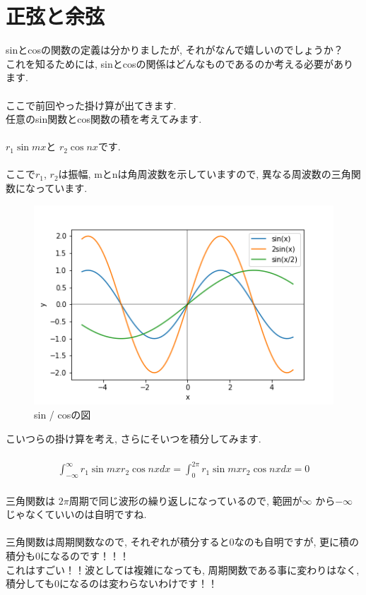 \documentclass[11pt,a4paper]{jreport}
\begin{document}
\section{正弦と余弦}
sinとcosの関数の定義は分かりましたが, それがなんで嬉しいのでしょうか？\\
これを知るためには, sinとcosの関係はどんなものであるのか考える必要があります.\\
\\
ここで前回やった掛け算が出てきます. \\
任意のsin関数とcos関数の積を考えてみます.\\
\\
$r_1\sin mx $と $r_2\cos nx $です.\\
\\
ここで$r_1$, $r_2$は振幅, mとnは角周波数を示していますので, 異なる周波数の三角関数になっています.\\

\begin{figure}[H]
\label{im:sincos}
  \centering
  \includegraphics[width=120mm,bb=0 0 432 288]{figures/sines.png}
  \caption{sin / cosの図}
\end{figure}

こいつらの掛け算を考え, さらにそいつを積分してみます.\\
\\
\begin{eqnarray}
  \int^\infty_{-\infty} r_1\sin mx r_2\cos nx dx = \int^{2\pi}_0 r_1\sin mx r_2\cos nx dx = 0
\end{eqnarray}
\\
三角関数は $2\pi$周期で同じ波形の繰り返しになっているので, 範囲が$\infty$ から$-\infty$じゃなくていいのは自明ですね.\\
\\
三角関数は周期関数なので, それぞれが積分すると0なのも自明ですが, 更に積の積分も0になるのです！！！\\
これはすごい！！波としては複雑になっても, 周期関数である事に変わりはなく, 積分しても0になるのは変わらないわけです！！\\
\end{document}
